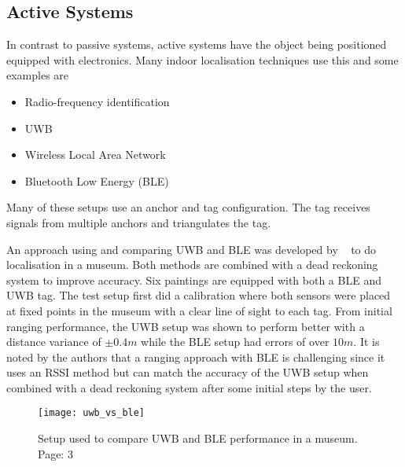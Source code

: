 \subsection{Active Systems}
In contrast to passive systems, active systems have the object being positioned equipped with electronics.
Many indoor localisation techniques use this and some examples are ~\citep{deak2012survey}
\begin{itemize}
    \item Radio-frequency identification
    \item UWB
    \item Wireless Local Area Network
    \item Bluetooth Low Energy (BLE)
\end{itemize}
Many of these setups use an anchor and tag configuration.
The tag receives signals from multiple anchors and triangulates the tag.

An approach using and comparing UWB and BLE was developed by ~\cite{findobjs} to do localisation in a museum.
Both methods are combined with a dead reckoning system to improve accuracy.
Six paintings are equipped with both a BLE and UWB tag.
The test setup first did a calibration where both sensors were placed at fixed points in the museum with a clear line of sight to each tag.
From initial ranging performance, the UWB setup was shown to perform better with a distance variance of $\pm0.4m$ while the BLE setup had errors of over $10m$.
It is noted by the authors that a ranging approach with BLE is challenging since it uses an RSSI method but can match the accuracy of the UWB setup when combined with a dead reckoning system after some initial steps by the user.

\begin{figure}[h!]
    \centering
    \texttt{[image: uwb\_vs\_ble]}
    \caption{Setup used to compare UWB and BLE performance in a museum. \cite{findobjs} Page: 3}
    \label{fig:uwbvsble}
\end{figure}

